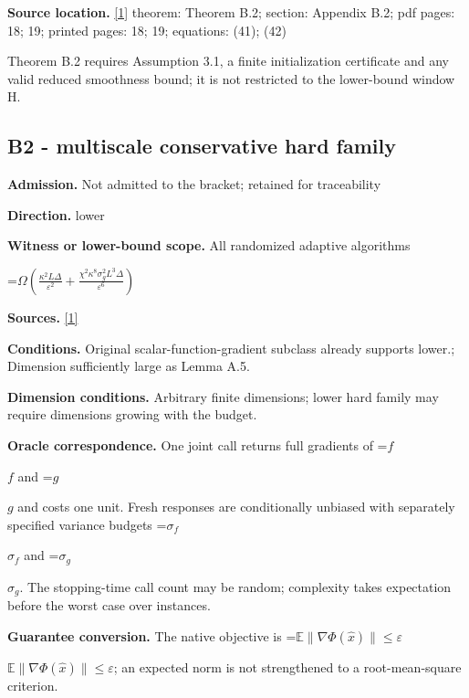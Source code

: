 \documentclass[10pt,a4paper]{article}
\newcommand{\AtlasMath}[1]{\par\begingroup\centering\setbox0=\hbox{$\displaystyle #1$}\ifdim\wd0>1.4\linewidth\typeout{ATLAS WIDE FORMULA: \the\wd0}\fi\ifdim\wd0>\linewidth\resizebox{\linewidth}{!}{\box0}\else\box0\fi\par\endgroup}
\newcommand{\AtlasInlineMath}[1]{\begingroup\setbox0=\hbox{$#1$}\ifdim\wd0>.4\linewidth\endgroup\AtlasMath{#1}\else\endgroup$#1$\fi}
\begin{document}
\textbf{Source location.} \href{https://arxiv.org/pdf/2610.03633v2}{[1]} theorem: Theorem B.2; section: Appendix B.2; pdf pages: 18; 19; printed pages: 18; 19; equations: (41); (42)



Theorem B.2 requires Assumption 3.1, a finite initialization certificate and any valid reduced smoothness bound; it is not restricted to the lower-bound window H.



\subsection{B2 - multiscale conservative hard family}


\textbf{Admission.} Not admitted to the bracket; retained for traceability



\textbf{Direction.} lower



\textbf{Witness or lower-bound scope.} All randomized adaptive algorithms



\AtlasMath{\Omega\!\left(\frac{\kappa^2L\Delta}{\varepsilon^2}+\frac{\chi^2\kappa^8\sigma_g^2L^3\Delta}{\varepsilon^6}\right)}


\textbf{Sources.} \href{https://arxiv.org/pdf/2610.03633v2}{[1]}



\textbf{Conditions.} Original scalar-function-gradient subclass already supports lower.; Dimension sufficiently large as Lemma A.5.



\textbf{Dimension conditions.} Arbitrary finite dimensions; lower hard family may require dimensions growing with the budget.



\textbf{Oracle correspondence.} One joint call returns full gradients of \AtlasInlineMath{f} and \AtlasInlineMath{g} and costs one unit. Fresh responses are conditionally unbiased with separately specified variance budgets \AtlasInlineMath{\sigma_f} and \AtlasInlineMath{\sigma_g}. The stopping-time call count may be random; complexity takes expectation before the worst case over instances.



\textbf{Guarantee conversion.} The native objective is \AtlasInlineMath{\mathbb E\|\nabla\Phi(\widehat x)\|\le\varepsilon}; an expected norm is not strengthened to a root-mean-square criterion.
\end{document}
